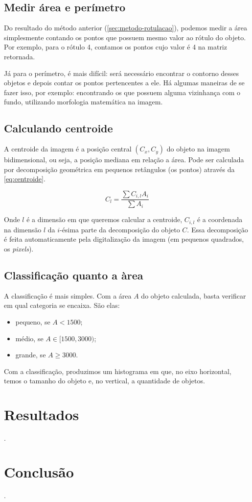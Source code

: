 \documentclass[brazilian,a4paper,twocolumn]{article}
\begin{document}
    \subsection{Medir área e perímetro}

        Do resultado do método anterior (\ref{sec:metodo-rotulacao}), podemos medir a área simplesmente contando os pontos que possuem mesmo valor ao rótulo do objeto. Por exemplo, para o rótulo 4, contamos os pontos cujo valor é 4 na matriz retornada.

        Já para o perímetro, é mais difícil: será necessário encontrar o contorno desses objetos e depois contar os pontos pertencentes a ele. Há algumas maneiras de se fazer isso, por exemplo: encontrando os que possuem alguma vizinhança com o fundo, utilizando morfologia matemática na imagem.

    \subsection{Calculando centroide}

        A centroide da imagem é a posição central $ (C_x, C_y) $ do objeto na imagem bidimensional, ou seja, a posição mediana em relação a área. Pode ser calculada por decomposição geométrica em pequenos retângulos (os pontos) através da \cref{eq:centroide}.

        \begin{equation}
            \label{eq:centroide}
            C_l = \frac{\sum C_{i,l} A_i}{\sum A_i}
        \end{equation}

        Onde $l$ é a dimensão em que queremos calcular a centroide, $C_{i,l}$ é a coordenada na dimensão $l$ da $i$-ésima parte da decomposição do objeto $C$. Essa decomposição é feita automaticamente pela digitalização da imagem (em pequenos quadrados, os \textit{pixels}).

    \subsection{Classificação quanto a àrea}

        A classificação é mais simples. Com a área $A$ do objeto calculada, basta verificar em qual categoria se encaixa. São elas:
        \begin{itemize}
            \item pequeno, se $A < 1500$;
            \item médio, se $A \in [1500, 3000)$;
            \item grande, se $A \geq 3000$.
        \end{itemize}

        Com a classificação, produzimos um histograma em que, no eixo horizontal, temos o tamanho do objeto e, no vertical, a quantidade de objetos.

\section{Resultados}

    .


\section{Conclusão}

    .
\end{document}
